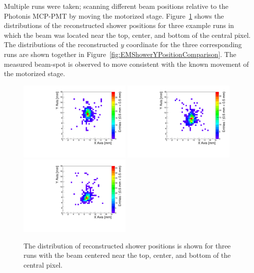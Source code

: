 Multiple runs were taken; scanning different beam positions relative to the
Photonis MCP-PMT by moving the motorized stage. Figure~\ref{fig:EMShowerPositions} shows the distributions of the
reconstructed shower positions for three example runs in which the beam was
located near the top, center, and bottom of the central pixel. The distributions
of the reconstructed $y$ coordinate for the three corresponding runs are shown
together in Figure~\ref{fig:EMShowerYPositionComparison}. The measured beam-spot
is observed to move consistent with the known movement of the motorized stage.
\begin{figure}[h] \centering
\includegraphics[width=0.49\textwidth]{Images/centers/run30dist.pdf}
\includegraphics[width=0.49\textwidth]{Images/centers/run32dist.pdf}
\includegraphics[width=0.49\textwidth]{Images/centers/run34dist.pdf}
\caption{The distribution of reconstructed shower positions is shown for three
runs with the beam centered near the top, center, and bottom of the central
pixel. } \label{fig:EMShowerPositions} \end{figure} \begin{figure}[h]
\centering

\end{figure}
